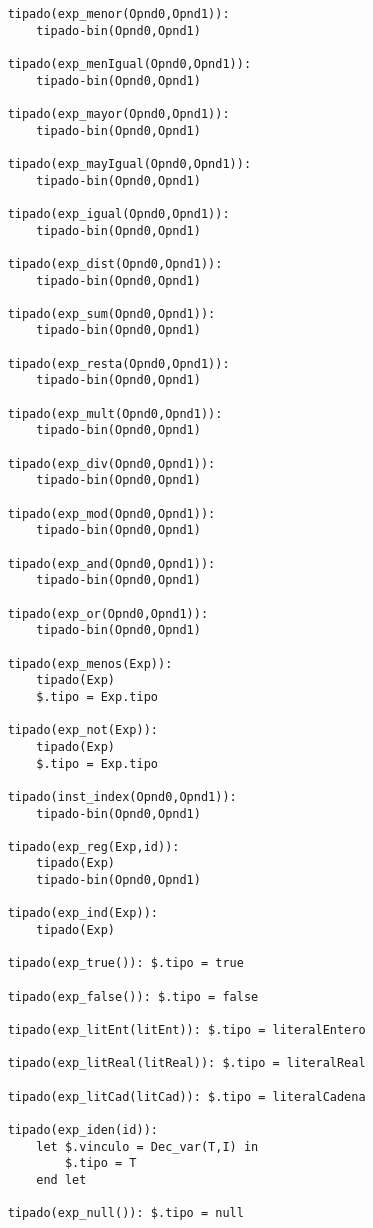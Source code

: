 \begin{lstlisting}
    tipado(exp_menor(Opnd0,Opnd1)):
        tipado-bin(Opnd0,Opnd1)

    tipado(exp_menIgual(Opnd0,Opnd1)):
        tipado-bin(Opnd0,Opnd1)

    tipado(exp_mayor(Opnd0,Opnd1)):
        tipado-bin(Opnd0,Opnd1)

    tipado(exp_mayIgual(Opnd0,Opnd1)):
        tipado-bin(Opnd0,Opnd1)

    tipado(exp_igual(Opnd0,Opnd1)):
        tipado-bin(Opnd0,Opnd1)

    tipado(exp_dist(Opnd0,Opnd1)):
        tipado-bin(Opnd0,Opnd1)

    tipado(exp_sum(Opnd0,Opnd1)):
        tipado-bin(Opnd0,Opnd1)

    tipado(exp_resta(Opnd0,Opnd1)):
        tipado-bin(Opnd0,Opnd1)

    tipado(exp_mult(Opnd0,Opnd1)):
        tipado-bin(Opnd0,Opnd1)

    tipado(exp_div(Opnd0,Opnd1)):
        tipado-bin(Opnd0,Opnd1)

    tipado(exp_mod(Opnd0,Opnd1)):
        tipado-bin(Opnd0,Opnd1)

    tipado(exp_and(Opnd0,Opnd1)):
        tipado-bin(Opnd0,Opnd1)

    tipado(exp_or(Opnd0,Opnd1)):
        tipado-bin(Opnd0,Opnd1)

    tipado(exp_menos(Exp)):
        tipado(Exp)
        $.tipo = Exp.tipo

    tipado(exp_not(Exp)):
        tipado(Exp)
        $.tipo = Exp.tipo

    tipado(inst_index(Opnd0,Opnd1)):
        tipado-bin(Opnd0,Opnd1)

    tipado(exp_reg(Exp,id)):
        tipado(Exp)
        tipado-bin(Opnd0,Opnd1)

    tipado(exp_ind(Exp)):
        tipado(Exp)

    tipado(exp_true()): $.tipo = true

    tipado(exp_false()): $.tipo = false

    tipado(exp_litEnt(litEnt)): $.tipo = literalEntero

    tipado(exp_litReal(litReal)): $.tipo = literalReal

    tipado(exp_litCad(litCad)): $.tipo = literalCadena

    tipado(exp_iden(id)):
        let $.vinculo = Dec_var(T,I) in
            $.tipo = T
        end let

    tipado(exp_null()): $.tipo = null


\end{lstlisting}

